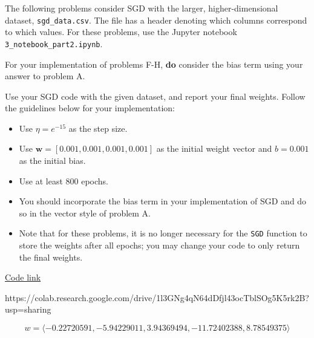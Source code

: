 The following problems consider SGD with the larger, higher-dimensional dataset, \texttt{sgd_data.csv}. The file has a header denoting which columns correspond to which values. For these problems, use the Jupyter notebook \texttt{3_notebook_part2.ipynb}.

For your implementation of problems F-H, \textbf{do} consider the bias term using your answer to problem A.

\newpage

\begin{problem}[6]
  Use your SGD code with the given dataset, and report your final weights. Follow the guidelines below for your implementation:

  \begin{itemize}
    \item Use $\eta = e^{-15}$ as the step size.  
    \item Use $\mathbf{w} = [0.001, 0.001, 0.001, 0.001]$ as the initial weight vector and $b = 0.001$ as the initial bias.
    \item Use at least 800 epochs.
    \item You should incorporate the bias term in your implementation of SGD and do so in the vector style of problem A.
    \item Note that for these problems, it is no longer necessary for the \texttt{SGD} function to store the weights after all epochs; you may change your code to only return the final weights.
  \end{itemize}
\end{problem}
\begin{solution}
  \href{https://colab.research.google.com/drive/1l3GNg4qN64dDfjl43ocTblSOg5K5rk2B?usp=sharing}{Code link}

  https://colab.research.google.com/drive/1l3GNg4qN64dDfjl43ocTblSOg5K5rk2B?usp=sharing

  \[
    w = \langle -0.22720591, -5.94229011, 3.94369494, -11.72402388, 8.78549375 \rangle
  \]
\end{solution}

\newpage

